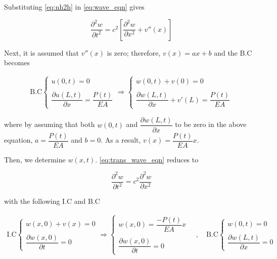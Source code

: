 \documentclass{article}
\begin{document}
Substituting \cref{eq:nh2h} in \cref{eq:wave_eqn} gives

\begin{equation}
    \dfrac{\partial^2 w}{\partial t^2} = c^2 \left[ \dfrac{\partial^2 w}{\partial x^2} + v''(x) \right]
\label{eq:trans_wave_eqn}
\end{equation}

Next, it is assumed that $v''(x)$ is zero; therefore, $v(x) = ax + b$ and the B.C becomes

\begin{equation*}
\begin{matrix}
    \text{B.C}\begin{cases}
        u(0, t) = 0 \\
        \\
        \dfrac{\partial u(L, t)}{\partial x} = \dfrac{P(t)}{EA}
    \end{cases}
    \Rightarrow
    \begin{cases}
        w(0, t) + v(0) = 0 \\
        \\
        \dfrac{\partial w(L, t)}{\partial x} + v'(L) = \dfrac{P(t)}{EA}
    \end{cases}
\end{matrix}
\end{equation*}

where by assuming that both $w(0, t)$ and $\dfrac{\partial w(L, t)}{\partial x}$ to be zero in the above equation, $a = \dfrac{P(t)}{EA}$ and $b= 0$. As a result, $v(x) = \dfrac{P(t)}{EA} x$.

Then, we determine $w(x, t)$. \cref{eq:trans_wave_eqn} reduces to 

\begin{equation}
    \dfrac{\partial^2 w}{\partial t^2} = c^2 \dfrac{\partial^2 w}{\partial x^2}
\label{eq:red_trans_wave_eqn}
\end{equation}

with the following I.C and B.C

\begin{equation*}
\begin{matrix}
    \text{I.C}\begin{cases}
        w(x, 0) + v(x)= 0 \\ 
        \\
        \dfrac{\partial w(x, 0)}{\partial t} = 0 
    \end{cases}
    \Rightarrow 
    \begin{cases}
        w(x, 0) = \dfrac{-P(t)}{EA}x \\ 
        \\
        \dfrac{\partial w(x, 0)}{\partial t} = 0 
    \end{cases} \quad , \quad
    \text{B.C}\begin{cases}
        w(0, t) = 0 \\
        \\
        \dfrac{\partial w(L, t)}{\partial x} = 0
    \end{cases}
\end{matrix}
\end{equation*}
\end{document}
